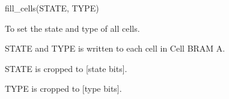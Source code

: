 

\format
fill\_cells(STATE, TYPE)

\purpose

To set the state and type of all cells.

\description

STATE and TYPE is written to each cell in Cell BRAM A.

\notes

STATE is cropped to [state bits].

TYPE is cropped to [type bits].
